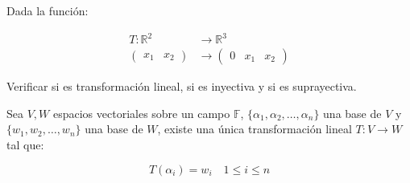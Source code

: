 		\begin{ejercicio}
			Dada la función:

			\begin{align*}
				T \colon \mathbb{R}^2 &\to \mathbb{R}^3 \\
				\begin{pmatrix} x_1 & x_2 \end{pmatrix} &\to \begin{pmatrix} 0 & x_1 & x_2 \end{pmatrix}
			\end{align*}

			Verificar si es transformación lineal, si es inyectiva y si es suprayectiva.
		\end{ejercicio}

		\begin{teorema}
			Sea $V, W$ espacios vectoriales sobre un campo $\mathbb{F}$, $\{\alpha_1, \alpha_2, \dots, \alpha_n\}$ una base de $V$ y $\{w_1, w_2, \dots, w_n\}$ una base de $W$, existe una única transformación lineal $T \colon V \to W$ tal que:

			\begin{equation}
				T(\alpha_i) = w_i \quad 1 \leq i \leq n
			\end{equation}
		\end{teorema}

